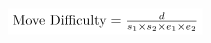\documentclass{article}
\begin{document}
\[
\colorbox{white}{$
\text{Move Difficulty} = \frac{d}{s_1 \times s_2 \times e_1 \times e_2}
$}
\]
\end{document}
